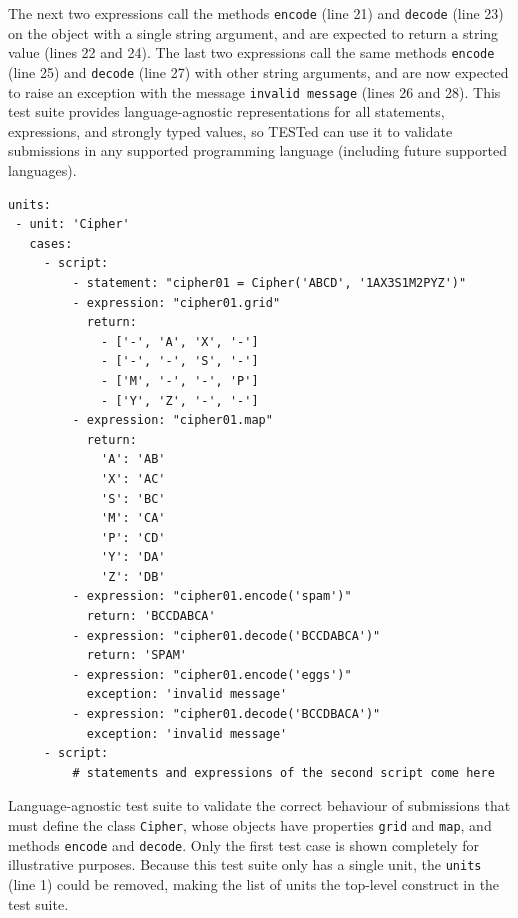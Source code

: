 \documentclass[../main]{subfiles}
\begin{document}
The next two expressions call the methods \texttt{encode} (line 21) and \texttt{decode} (line 23) on the object with a single string argument, and are expected to return a string value (lines 22 and 24).
The last two expressions call the same methods \texttt{encode} (line 25) and \texttt{decode} (line 27) with other string arguments, and are now expected to raise an exception with the message \texttt{invalid message} (lines 26 and 28).
This test suite provides language-agnostic representations for all statements, expressions, and strongly typed values, so TESTed can use it to validate submissions in any supported programming language (including future supported languages).

\begin{listing}
    \begin{verbatim}
units:
 - unit: 'Cipher'
   cases:
     - script:
         - statement: "cipher01 = Cipher('ABCD', '1AX3S1M2PYZ')"
         - expression: "cipher01.grid"
           return:
             - ['-', 'A', 'X', '-']
             - ['-', '-', 'S', '-']
             - ['M', '-', '-', 'P']
             - ['Y', 'Z', '-', '-']
         - expression: "cipher01.map"
           return:
             'A': 'AB'
             'X': 'AC'
             'S': 'BC'
             'M': 'CA'
             'P': 'CD'
             'Y': 'DA'
             'Z': 'DB'
         - expression: "cipher01.encode('spam')"
           return: 'BCCDABCA'
         - expression: "cipher01.decode('BCCDABCA')"
           return: 'SPAM'
         - expression: "cipher01.encode('eggs')"
           exception: 'invalid message'
         - expression: "cipher01.decode('BCCDBACA')"
           exception: 'invalid message'
     - script:
         # statements and expressions of the second script come here
    \end{verbatim}
    \caption[]{
        Language-agnostic test suite to validate the correct behaviour of submissions that must define the class \texttt{Cipher}, whose objects have properties \texttt{grid} and \texttt{map}, and methods \texttt{encode} and \texttt{decode}. Only the first test case is shown completely for illustrative purposes. Because this test suite only has a single unit, the \texttt{units} (line 1) could be removed, making the list of units the top-level construct in the test suite.
    }
    \label{lst:cipher-example}
\end{listing}
\end{document}
